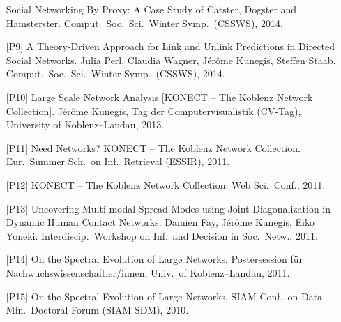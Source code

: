 \documentclass[line,mm]{res}
\newcounter{x}
\newcounter{y}
\newcounter{z}
\begin{document}
\begin{resume}
\begin{itemize}
    Social Networking By Proxy: A Case Study of Catster, Dogster and
    Hamsterster. Comput.\ Soc.\ Sci.\ Winter
    Symp.\ (CSSWS), 2014.
  \item[{[P9]}] 
    A Theory-Driven Approach for Link and Unlink Predictions in
    Directed Social Networks. Julia Perl, Claudia Wagner, Jérôme
    Kunegis, Steffen Staab.  Comput.\ Soc.\ Sci.\ Winter
    Symp.\ (CSSWS), 2014.
  \item[{[P10]}]
    Large Scale Network Analysis [KONECT -- The Koblenz Network Collection].
    Jérôme Kunegis,
    Tag der Computervisualistik (CV-Tag), University of Koblenz--Landau, 2013. 
  \item[{[P11]}]
    Need Networks? KONECT -- The Koblenz Network Collection.
    Eur.\ Summer Sch.\ on Inf.\ Retrieval (ESSIR), 2011. 
  \item[{[P12]}]
    KONECT -- The Koblenz Network Collection. Web Sci.\ Conf., 2011. 
  \item[{[P13]}]
    Uncovering Multi-modal Spread Modes using Joint 
    Diagonalization in Dynamic Human Contact Networks. 
    Damien Fay, Jérôme Kunegis, Eiko Yoneki.  Interdiscip.\ Workshop on Inf.\ and Decision in Soc.\ Netw., 2011. 
  \item[{[P14]}]
    On the Spectral Evolution of Large Networks. Postersession 
    für Nachwuchswissenschaftler/innen, Univ.\ of Koblenz--Landau,
    2011. 
  \item[{[P15]}]
    On the Spectral Evolution of Large Networks. SIAM 
    Conf.\ on Data Min.\ Doctoral Forum (SIAM SDM), 2010. 
\end{itemize}


\end{resume}
\end{document}
